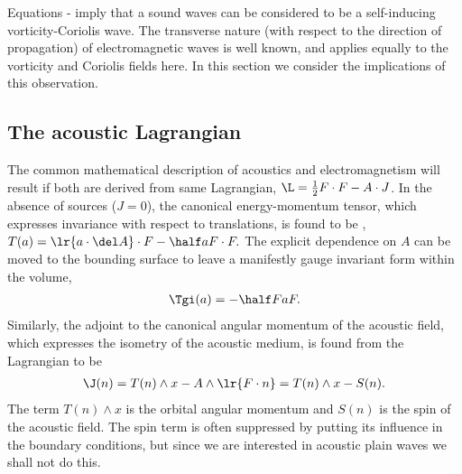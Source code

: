 Equations - imply that a sound waves can be considered to be a self-inducing vorticity-Coriolis wave.
The transverse nature (with respect to the direction of propagation)  of electromagnetic waves is well known, and applies equally to the vorticity and Coriolis fields here.
In this section we consider the implications of this observation.




\subsection{The acoustic Lagrangian}\label{sec:lagrangian}
The common mathematical  description of acoustics and electromagnetism will result if both are derived from same Lagrangian,
 $ \L = \frac{1}{2} F \cdot F  - A \cdot J$.
In the absence of sources ($J = 0$),
the canonical energy-momentum tensor, which expresses invariance with respect to translations,
is found to be \cite{Lasenby1993, Doran2003},  $T(a) = \lr{a\cdot \del A}\cdot F - \half a F \cdot F.$
The explicit dependence on $A$ can be moved to the bounding surface \cite{Lasenby1993}
to leave a manifestly gauge invariant form within the volume,
\begin{align}
\label{eqn:TAEM}
  \Tgi(a) = -\half F a F.
\end{align}
Similarly, the  adjoint to the canonical angular momentum of the acoustic field, which expresses the isometry of the acoustic medium, 
is found from the Lagrangian to be \cite{Lasenby1993}
\begin{align}
  \label{eqn:AM}
  \J(n) = T(n) \wedge x - A \wedge \lr{F\cdot n} = T(n) \wedge x - S(n).
\end{align}
The term $T(n) \wedge x$ is the  orbital angular momentum and $S(n)$ is the spin of the acoustic field.
The spin term is often suppressed by putting its influence in the boundary conditions,
but since we are interested in acoustic plain waves we shall not do this.
